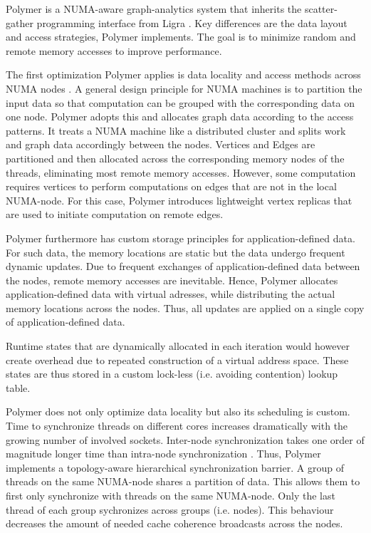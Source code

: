 
Polymer is a NUMA-aware graph-analytics system that inherits the scatter- gather programming interface from Ligra \cite{Ligra}. 
Key differences are the data layout and access strategies, Polymer implements.
The goal is to minimize random and remote memory accesses to improve performance. 

The first optimization Polymer applies is data locality and access methods across NUMA nodes \cite{Polymer}.
A general design principle for NUMA machines is to partition the input data so that computation can be grouped with the corresponding data on one node.
Polymer adopts this and allocates graph data according to the access patterns.
It treats a NUMA machine like a distributed cluster and splits work and graph data accordingly between the nodes. 
Vertices and Edges are partitioned and then allocated across the corresponding memory nodes of the threads, eliminating most remote memory accesses.
However, some computation requires vertices to perform computations on edges that are not in the local NUMA-node.
For this case, Polymer introduces lightweight vertex replicas that are used to initiate computation on remote edges.

Polymer furthermore has custom storage principles for application-defined data.
For such data, the memory locations are static but the data undergo frequent dynamic updates. Due to frequent exchanges of application-defined data between the nodes, remote memory accesses are inevitable.
Hence, Polymer allocates application-defined data with virtual adresses, while distributing the actual memory locations across the nodes. Thus, all updates are applied on a single copy of application-defined data.

Runtime states that are dynamically allocated in each iteration would however create overhead due to repeated construction of a virtual address space.
These states are thus stored in a custom lock-less (i.e. avoiding contention) lookup table.

Polymer does not only optimize data locality but also its scheduling is custom.
Time to synchronize threads on different cores increases dramatically with the growing number of involved sockets. Inter-node synchronization takes one order of magnitude longer time than intra-node synchronization \cite{Polymer}.
Thus, Polymer implements a topology-aware hierarchical synchronization barrier.
A group of threads on the same NUMA-node shares a partition of data. This allows them to first only synchronize with threads on the same NUMA-node. Only the last thread of each group sychronizes across groups (i.e. nodes). This behaviour decreases the amount of needed cache coherence broadcasts across the nodes.

